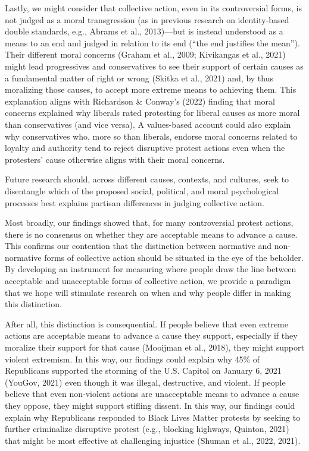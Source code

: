 \documentclass[12pt, letterpaper]{article}
\begin{document}
Lastly, we might consider that collective action, even in its
controversial forms, is not judged as a moral transgression (as in
previous research on identity-based double standards, e.g., Abrams et
al., 2013)---but is instead understood as a means to an end and judged
in relation to its end (``the end justifies the mean''). Their different
moral concerns (Graham et al., 2009; Kivikangas et al., 2021) might lead
progressives and conservatives to see their support of certain causes as
a fundamental matter of right or wrong (Skitka et al., 2021) and, by
thus moralizing those causes, to accept more extreme means to achieving
them. This explanation aligns with Richardson \& Conway's (2022) finding
that moral concerns explained why liberals rated protesting for liberal
causes as more moral than conservatives (and vice versa). A values-based
account could also explain why conservatives who, more so than liberals,
endorse moral concerns related to loyalty and authority tend to reject
disruptive protest actions even when the protesters' cause otherwise
aligns with their moral concerns.

Future research should, across different causes, contexts, and cultures,
seek to disentangle which of the proposed social, political, and moral
psychological processes best explains partisan differences in judging
collective action.

Most broadly, our findings showed that, for many controversial protest
actions, there is no consensus on whether they are acceptable means to
advance a cause. This confirms our contention that the distinction
between normative and non-normative forms of collective action should be
situated in the eye of the beholder. By developing an instrument for
measuring where people draw the line between acceptable and unacceptable
forms of collective action, we provide a paradigm that we hope will
stimulate research on when and why people differ in making this
distinction.

After all, this distinction is consequential. If people believe that
even extreme actions are acceptable means to advance a cause they
support, especially if they moralize their support for that cause
(Mooijman et al., 2018), they might support violent extremism. In this
way, our findings could explain why 45\% of Republicans supported the
storming of the U.S. Capitol on January 6, 2021 (YouGov, 2021) even
though it was illegal, destructive, and violent. If people believe that
even non-violent actions are unacceptable means to advance a cause they
oppose, they might support stifling dissent. In this way, our findings
could explain why Republicans responded to Black Lives Matter protests
by seeking to further criminalize disruptive protest (e.g., blocking
highways, Quinton, 2021) that might be most effective at challenging
injustice (Shuman et al., 2022, 2021).
\end{document}
